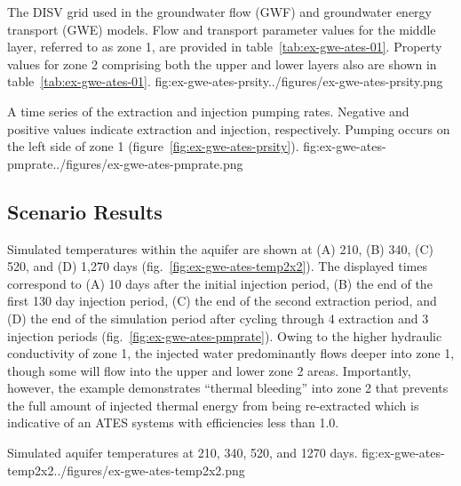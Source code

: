 \begin{StandardFigure}{
    The DISV grid used in the groundwater flow (GWF) and groundwater energy transport (GWE) models.  Flow and transport parameter values for the middle layer, referred to as zone 1, are provided in table~\ref{tab:ex-gwe-ates-01}.  Property values for zone 2 comprising both the upper and lower layers also are shown in table~\ref{tab:ex-gwe-ates-01}.}
    {fig:ex-gwe-ates-prsity}{../figures/ex-gwe-ates-prsity.png}
\end{StandardFigure}

\begin{StandardFigure}{
    A time series of the extraction and injection pumping rates. Negative and positive values indicate extraction and injection, respectively.  Pumping occurs on the left side of zone 1 (figure~\ref{fig:ex-gwe-ates-prsity}). }
    {fig:ex-gwe-ates-pmprate}{../figures/ex-gwe-ates-pmprate.png}
\end{StandardFigure}

\subsection{Scenario Results}

Simulated temperatures within the aquifer are shown at (A) 210, (B) 340, (C) 520, and (D) 1,270 days (fig.~\ref{fig:ex-gwe-ates-temp2x2}).  The displayed times correspond to (A) 10 days after the initial injection period, (B) the end of the first 130 day injection period, (C) the end of the second extraction period, and (D) the end of the simulation period after cycling through 4 extraction and 3 injection periods (fig.~\ref{fig:ex-gwe-ates-pmprate}).  Owing to the higher hydraulic conductivity of zone 1, the injected water predominantly flows deeper into zone 1, though some will flow into the upper and lower zone 2 areas.  Importantly, however, the example demonstrates ``thermal bleeding'' into zone 2 that prevents the full amount of injected thermal energy from being re-extracted which is indicative of an ATES systems with efficiencies less than 1.0.  

\begin{StandardFigure}{
    Simulated aquifer temperatures at 210, 340, 520, and 1270 days.}
    {fig:ex-gwe-ates-temp2x2}{../figures/ex-gwe-ates-temp2x2.png}
\end{StandardFigure}
